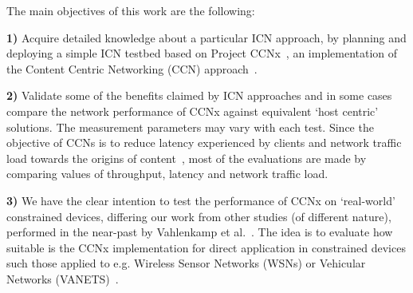 The main objectives of this work are the following:\vertbreak

\textbf{1)} Acquire detailed knowledge about a particular ICN approach, by 
            planning and deploying a simple ICN testbed based on 
            Project CCNx~\cite{website:ccnx}, an implementation of the Content 
            Centric Networking (CCN) approach~\cite{Jacobson2009}.\vertbreak

\textbf{2)} Validate some of the benefits claimed by ICN approaches and in some 
            cases compare the network performance of CCNx against equivalent 
            `host centric' solutions. The 
            measurement parameters may vary with each test. Since the 
            objective of CCNs is to reduce latency experienced by clients and 
            network traffic load towards the origins of 
            content~\cite{Jacobson2009}, most of the evaluations are made by 
            comparing values of throughput, latency and network traffic 
            load.\vertbreak

\textbf{3)} We have the clear intention to test the performance of CCNx on 
            `real-world' constrained devices, differing our work from other 
            studies (of different nature), performed in the near-past by Vahlenkamp et 
            al.~\cite{Wahlisch2012, Vahlenkamp2012}. The idea is to evaluate 
            how suitable is the CCNx implementation for direct application 
            in constrained devices such those applied to e.g. Wireless Sensor 
            Networks (WSNs) or Vehicular Networks (VANETS)~\cite{Amadeo2013,Grassi2013}.

